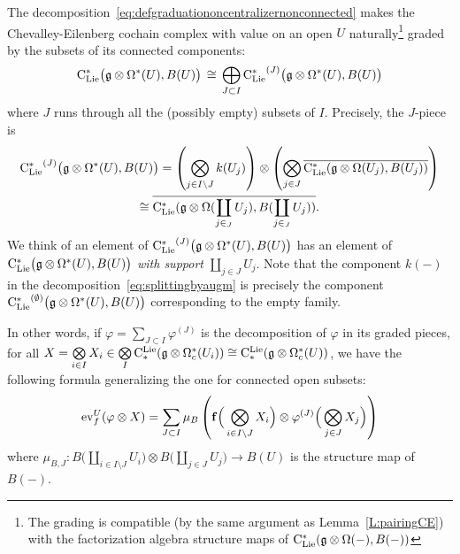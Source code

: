 \documentclass[11pt]{amsart}
\numberwithin{equation}{section}
\begin{document}
\begin{rmk}\label{Rmk:defgraduationclie} The decomposition~\eqref{eq:defgraduationoncentralizernonconnected} makes 
the Chevalley-Eilenberg cochain complex with value on an open $U$ naturally\footnote{The grading
is compatible (by the same argument as Lemma~\ref{L:pairingCE}) with the factorization algebra structure maps of
${\rm C}_{\rm Lie}^*(\mathfrak g\otimes \Omega(-), B(-))$} graded by the subsets of its connected components:
 \begin{equation}\label{eq:defgraduationoncentralizernonconnected2}
 {\rm C}_{\rm Lie}^*\big(\mathfrak g\otimes \Omega^*(U), B(U)\big)  \, \cong \, \bigoplus\limits_{J\subset I} {{\rm C}_{\rm Lie}^*}^{(J)}\big(\mathfrak g\otimes \Omega^*(U), B(U)\big) 
\end{equation}
where $J$ runs through all the (possibly empty) subsets of $I$.  Precisely, the $J$-piece is
\begin{multline*}
{{\rm C}_{\rm Lie}^*}^{(J)}\big(\mathfrak g\otimes \Omega^*(U), B(U)\big) = 
\left(\bigotimes\limits_{j\in I\setminus J} k(U_j)\right) \otimes \left(\bigotimes\limits_{j\in J}
\overline{{\rm C}_{\rm Lie}^* (\mathfrak g\otimes \Omega (U_j), B(U_j))  }\right) \\ \cong 
\overline{{\rm C}_{\rm Lie}^* (\mathfrak g\otimes \Omega (\coprod\limits_{j\in_J}U_j), B(\coprod\limits_{j\in_J}U_j))  }.
\end{multline*}
We think of an element of ${{\rm C}_{\rm Lie}^*}^{(J)}\big(\mathfrak g\otimes \Omega^*(U), B(U)\big)$ has an element of ${{\rm C}_{\rm Lie}^*}\big(\mathfrak g\otimes \Omega^*(U), B(U)\big)$
\emph{with support $\coprod\limits_{j\in J} U_j$}.   
Note that the component $k(-)$ in the decomposition~\eqref{eq:splittingbyaugm} is precisely the component 
${{\rm C}_{\rm Lie}^*}^{(\emptyset)}\big(\mathfrak g\otimes \Omega^*(U), B(U)\big)$ corresponding to the empty family.
\end{rmk}
In other words, if $\varphi = \sum_{J\subset I} \varphi^{(J)}$ is the decomposition of $\varphi$ in its graded pieces, for all 
$X= \bigotimes\limits_{i\in I} X_i \in \bigotimes\limits_{I}{\rm C}^{\rm Lie}_*(\mathfrak g\otimes \Omega_c^*(U_i)) \cong {\rm C}^{\rm Lie}_*(\mathfrak g\otimes \Omega^*_c(U))$, we 
have the following formula generalizing the one for connected open  subsets:
\begin{equation} {\rm ev}_f^U(\varphi\otimes X)= \sum_{J\subset I} \mu_B\left(\mathbf{f}\Big(\bigotimes\limits_{i\in I\setminus J} 
X_i\Big)\otimes  \varphi^{(J)}\Big(\bigotimes\limits_{j\in J} 
X_j\Big)\right) \end{equation}
where $\mu_{B,J}: B\Big(\coprod\limits_{i\in I\setminus J}U_i\Big)\otimes B\Big(\coprod\limits_{j\in J}U_j\Big) \to B(U)$
is the  structure map of $B(-)$.
\end{document}
